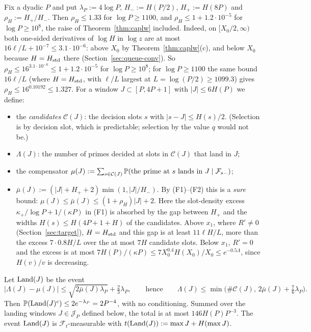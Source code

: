 Fix a dyadic $P$ and put $\lambda_P:=4\log P$, $H_-:=H(P/2)$, $H_+:=H(8P)$ and $\rho_H:=H_+/H_-$. Then $\rho_H\le1.33$ for
$\log P\ge1100$, and $\rho_H\le1+1.2\cdot10^{-5}$ for $\log P\ge10^8$, the raise of Theorem~\ref{thm:caplw} included. Indeed,
on $[X_0/2,\infty)$ both one-sided derivatives of $\log H$ in $\log z$ are at most $16\ell/L+10^{-7}\le3.1\cdot10^{-6}$: above
$X_0$ by Theorem~\ref{thm:caplw}(c), and below $X_0$ because $H=H_{\mathrm{std}}$ there (Section~\ref{sec:queue-conv}). So
$\rho_H\le16^{3.1\cdot10^{-6}}\le1+1.2\cdot10^{-5}$ for $\log P\ge10^8$; for $\log P\ge1100$ the same bound $16\ell/L$ (where $H=H_{\mathrm{std}}$,
with $\ell/L$ largest at $L=\log(P/2)\ge1099.3$) gives $\rho_H\le16^{0.10192}\le1.327$. For a window $J\subset[P,4P+1]$ with $|J|\le6H(P)$ we
define:
\begin{itemize}
\item the \emph{candidates} $\mathcal C(J)$: the decision slots $s$ with $|s-J|\le H(s)/2$. (Selection is by decision slot,
  which is predictable; selection by the value $q$ would not be.)
\item $\Lambda(J)$: the number of primes decided at slots in $\mathcal C(J)$ that land in $J$;
\item the compensator $\mu(J):=\sum_{s\in\mathcal C(J)}\mathbb{P}(\text{the prime at $s$ lands in $J$}\mid\mathcal F_{s-})$;
\item $\bar\mu(J):=(|J|+H_++2)\min(1,|J|/H_-)$. By (F1)--(F2) this is a \emph{sure} bound:
  $\mu(J)\le\bar\mu(J)\le(1+\rho_H)|J|+2$. Here the slot-density excess $\kappa_+/\log P+1/(\kappa P)$ in (F1) is absorbed by
  the gap between $H_+$ and the widths $H(s)\le H(4P+1+H)$ of the candidates. Above $x_1$, where $R'\ne0$ (Section~\ref{sec:target}),
  $H=H_{\mathrm{std}}$ and this gap is at least $11\ell H/L$, more than the excess $7\cdot0.8H/L$ over the at most $7H$ candidate
  slots. Below $x_1$, $R'=0$ and the excess is at most $7H(P)/(\kappa P)\le7X_0^{0.4}H(X_0)/X_0\le e^{-0.5\Lambda}$, since
  $H(v)/v$ is decreasing.
\end{itemize}

\begin{lemma}\label{lem:landing}
Let $\mathrm{Land}(J)$ be the event
\begin{equation}\label{eq:landing}
|\Lambda(J)-\mu(J)|\le\sqrt{2\bar\mu(J)\lambda_P}+\tfrac23\lambda_P,\qquad\text{hence}\qquad
\Lambda(J)\le\min\big(\#\mathcal C(J),\,2\bar\mu(J)+\tfrac76\lambda_P\big).
\end{equation}
Then $\mathbb{P}(\mathrm{Land}(J)^c)\le2e^{-\lambda_P}=2P^{-4}$, with no conditioning. Summed over the landing windows $J\in\mathcal J_P$
defined below, the total is at most $146H(P)P^{-3}$. The event $\mathrm{Land}(J)$ is $\mathcal F_t$-measurable with
$t(\mathrm{Land}(J)):=\max J+H(\max J)$.
\end{lemma}

